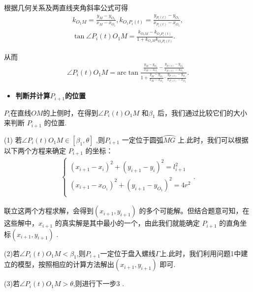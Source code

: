 \documentclass[../main.tex]{subfiles}
\begin{document}
根据几何关系及两直线夹角斜率公式可得
\begin{gather}\label{1.........444}
k_{O_1M}=\frac{y_M-y_{O_1}}{x_M-x_{O_1}},k_{O_1P_i\left( t \right)}=\frac{y_{P_i\left( t \right)}-y_{O_1}}{x_{P_i\left( t \right)}-x_{O_1}},
\\
\tan \angle P_i(t)O_1M=\frac{k_{O_1M}-k_{O_1P_i\left( t \right)}}{1+k_{O_1M}k_{O_1P_i\left( t \right)}}.
\end{gather}
\par 从而
\begin{align}\label{1.........445}
\angle P_i(t)O_1M= \mathrm{arc}\tan \frac{\frac{y_M-y_{O_1}}{x_M-x_{O_1}}-\frac{y_{P_i\left( t \right)}-y_{O_1}}{x_{P_i\left( t \right)}-x_{O_1}}}{1+\frac{y_M-y_{O_1}}{x_M-x_{O_1}}\cdot \frac{y_{P_i\left( t \right)}-y_{O_1}}{x_{P_i\left( t \right)}-x_{O_1}}}.
\end{align}
\begin{itemize}
\item \textbf{判断并计算$P_{i+1}$的位置}\label{subsubsection4.4.1.2}
\end{itemize}
    \par \(P_i\)在直线\(OM\)的上侧时，在得到\(\angle P_{i}(t)O_{1}M\) 和\(\beta_{1}\) 后，我们通过比较它们的大小来判断 \(P_{i + 1}\) 的位置.
    \par (1) 若$ \angle P_i(t)O_1M\in \left[ \beta _1,\theta \right]$ ,则\(P_{i + 1}\) 一定位于圆弧\(\wideparen{MG}\) 上.此时，我们可以根据以下两个方程来确定 \(P_{i + 1}\) 的坐标：
    \begin{align}\label{1.........446}
        \left\{ \begin{array}{c}
        \left( x_{i+1}-x_i \right) ^2+\left( y_{i+1}-y_i \right) ^2=l_{i+1}^{2}\\
        \left( x_{i+1}-x_{O_1} \right) ^2+\left( y_{i+1}-y_{O_1} \right) ^2=4r^2\\
        \end{array} \right. .
        \end{align}
\par 联立这两个方程求解，会得到\((x_{i + 1}, y_{i + 1})\) 的多个可能解。但结合题意可知，在这些解中，\(x_{i + 1}\) 的真实解是其中最小的一个，由此我们就能确定 \(P_{i + 1}\) 的直角坐标\((x_{i + 1}, y_{i + 1})\) .
\par (2)若$\angle P_i(t)O_1M< \beta_1$,则$P_{i+1}$一定位于盘入螺线$\varGamma$上.此时，我们利用问题1中建立的模型，按照相应的计算方法解出\((x_{i + 1}, y_{i + 1})\) 即可.
\par (3)若$\angle P_i(t)O_1M>\theta $,则进行下一步3  .
\end{document}
